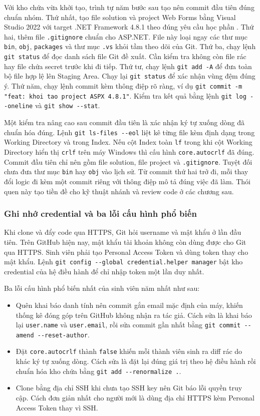 Với kho chứa vừa khởi tạo, trình tự năm bước sau tạo nên commit đầu tiên đúng chuẩn nhóm.
Thứ nhất, tạo file solution và project Web Forms bằng Visual Studio 2022 với target .NET Framework 4.8.1 theo đúng yêu cầu học phần \cite{msnetfx}.
Thứ hai, thêm file \texttt{.gitignore} chuẩn cho ASP.NET.
File này loại ngay các thư mục \texttt{bin}, \texttt{obj}, \texttt{packages} và thư mục \texttt{.vs} khỏi tầm theo dõi của Git.
Thứ ba, chạy lệnh \verb|git status| để đọc danh sách file Git đề xuất.
Cần kiểm tra không còn file rác hay file chứa secret trước khi đi tiếp.
Thứ tư, chạy lệnh \verb|git add -A| để đưa toàn bộ file hợp lệ lên Staging Area.
Chạy lại \verb|git status| để xác nhận vùng đệm đúng ý.
Thứ năm, chạy lệnh commit kèm thông điệp rõ ràng, ví dụ \verb|git commit -m "feat: khoi tao project ASPX 4.8.1"|.
Kiểm tra kết quả bằng lệnh \verb|git log --oneline| và \verb|git show --stat|.

Một kiểm tra nâng cao sau commit đầu tiên là xác nhận ký tự xuống dòng đã chuẩn hóa đúng.
Lệnh \verb|git ls-files --eol| liệt kê từng file kèm định dạng trong Working Directory và trong Index.
Nếu cột Index toàn \texttt{lf} trong khi cột Working Directory hiển thị \texttt{crlf} trên máy Windows thì cấu hình \verb|core.autocrlf| đã đúng.
Commit đầu tiên chỉ nên gồm file solution, file project và \texttt{.gitignore}.
Tuyệt đối chưa đưa thư mục \texttt{bin} hay \texttt{obj} vào lịch sử.
Từ commit thứ hai trở đi, mỗi thay đổi logic đi kèm một commit riêng với thông điệp mô tả đúng việc đã làm.
Thói quen này tạo tiền đề cho kỹ thuật nhánh và review code ở các chương sau.

\subsubsection{Ghi nhớ credential và ba lỗi cấu hình phổ biến}
\label{subsubsec:c2-1-credential-loi}

Khi clone và đẩy code qua HTTPS, Git hỏi username và mật khẩu ở lần đầu tiên.
Trên GitHub hiện nay, mật khẩu tài khoản không còn dùng được cho Git qua HTTPS.
Sinh viên phải tạo Personal Access Token và dùng token thay cho mật khẩu.
Lệnh \verb|git config --global credential.helper manager| bật kho credential của hệ điều hành để chỉ nhập token một lần duy nhất.

Ba lỗi cấu hình phổ biến nhất của sinh viên năm nhất như sau:

\begin{itemize}
\item Quên khai báo danh tính nên commit gắn email mặc định của máy, khiến thống kê đóng góp trên GitHub không nhận ra tác giả.
Cách sửa là khai báo lại \verb|user.name| và \verb|user.email|, rồi sửa commit gần nhất bằng \verb|git commit --amend --reset-author|.
\item Đặt \verb|core.autocrlf| thành \texttt{false} khiến mỗi thành viên sinh ra diff rác do khác ký tự xuống dòng.
Cách sửa là đặt lại đúng giá trị theo hệ điều hành rồi chuẩn hóa kho chứa bằng \verb|git add --renormalize .|.
\item Clone bằng địa chỉ SSH khi chưa tạo SSH key nên Git báo lỗi quyền truy cập.
Cách đơn giản nhất cho người mới là dùng địa chỉ HTTPS kèm Personal Access Token thay vì SSH.
\end{itemize}

